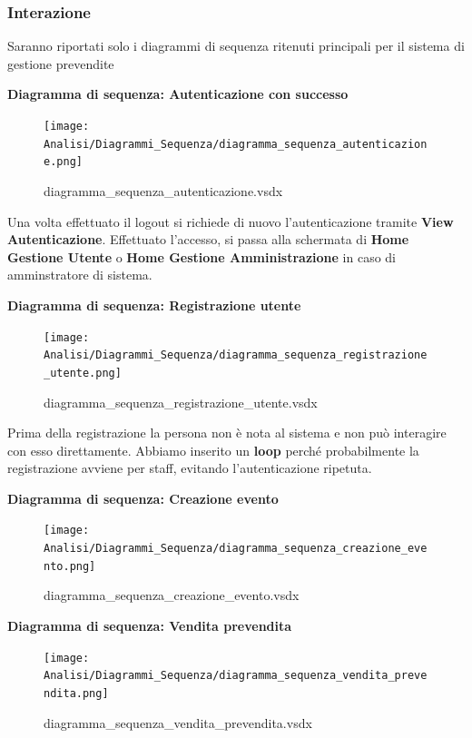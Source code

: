 \documentclass[a4paper]{article}
\begin{document}
\newpage

\subsubsection{Interazione}

Saranno riportati solo i diagrammi di sequenza ritenuti principali per il sistema di gestione prevendite

\textbf{Diagramma di sequenza: Autenticazione con successo}

\begin{figure}[H]
    \texttt{[image: Analisi/Diagrammi\_Sequenza/diagramma\_sequenza\_autenticazione.png]}
    \centering
    \caption{diagramma\_sequenza\_autenticazione.vsdx}
\end{figure}

Una volta effettuato il logout si richiede di nuovo l'autenticazione tramite \textbf{View Autenticazione}. Effettuato l'accesso, si passa alla schermata di \textbf{Home Gestione Utente} o \textbf{Home Gestione Amministrazione} in caso di amminstratore di sistema.

\textbf{Diagramma di sequenza: Registrazione utente}

\begin{figure}[H]
    \texttt{[image: Analisi/Diagrammi\_Sequenza/diagramma\_sequenza\_registrazione\_utente.png]}
    \centering
    \caption{diagramma\_sequenza\_registrazione\_utente.vsdx}
\end{figure}

Prima della registrazione la persona non è nota al sistema e non può interagire con esso direttamente. Abbiamo inserito un \textbf{loop} perché probabilmente la registrazione avviene per staff, evitando l'autenticazione ripetuta.

\newpage

\textbf{Diagramma di sequenza: Creazione evento}

\begin{figure}[H]
    \texttt{[image: Analisi/Diagrammi\_Sequenza/diagramma\_sequenza\_creazione\_evento.png]}
    \centering
    \caption{diagramma\_sequenza\_creazione\_evento.vsdx}
\end{figure}

\textbf{Diagramma di sequenza: Vendita prevendita}

\begin{figure}[H]
    \texttt{[image: Analisi/Diagrammi\_Sequenza/diagramma\_sequenza\_vendita\_prevendita.png]}
    \centering
    \caption{diagramma\_sequenza\_vendita\_prevendita.vsdx}
\end{figure}
\end{document}
